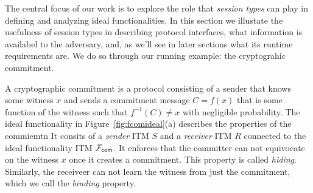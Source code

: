 
The central focus of our work is to explore the role that \emph{session types} can play in defining and analyzing ideal functionalities.
In this section we illustate the usefulness of session types in describing protocol interfaces, what information  is availabel to the adversary, and, as we'll see in later sections
what its runtime requirements are. 
We do so through our running example: the cryptograhic commitment. 

A cryptographic commitment is a protocol consisting of a sender that knows some witness $x$ and sends a commitment message $C = f(x)$ that is
some function of the witness such that $f^{-1}(C) \neq x$ with negligible probability. 
The ideal functionality \Fcom in Figure~\ref{fig:fcomideal}(a) describes the properties of the commiemtn
It consits of a  \emph{sender} ITM $S$ and a \emph{receiver} ITM $R$ connected to 
the ideal functionality ITM $\mathcal{F}_{{\mathsf {com}}}$. It enforces that the committer can not equivocate on the witness $x$ once it creates a commitment.
This property is called \emph{hiding}.
Similarly, the receiveer can not learn the witness from just the commitment, which we call the \emph{binding} property.

